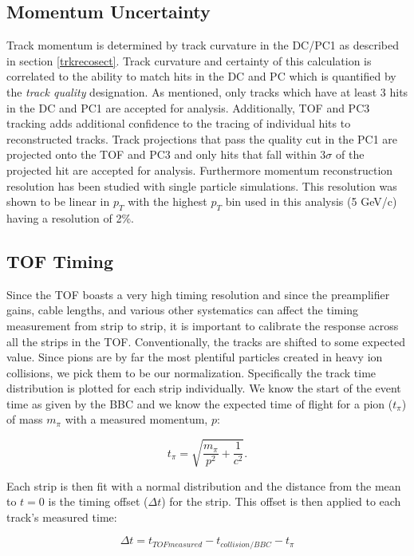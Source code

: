 \subsection{Momentum Uncertainty}
Track momentum is determined by track curvature in the DC/PC1 as described in section \ref{trkrecosect}. Track curvature and certainty of this calculation is correlated to the ability to match hits in the DC and PC which is quantified by the \textit{track quality} designation. As mentioned, only tracks which have at least 3 hits in the DC and PC1 are accepted for analysis. Additionally, TOF and PC3 tracking adds additional confidence to the tracing of individual hits to reconstructed tracks. Track projections that pass the quality cut in the PC1 are projected onto the TOF and PC3 and only hits that fall within $3\sigma$ of the projected hit are accepted for analysis. Furthermore momentum reconstruction resolution has been studied with single particle simulations\citep{Mitchell:2002wu}. This resolution was shown to be linear in $p_T$ with the highest $p_T$ bin used in this analysis (5 GeV/c) having a resolution of 2\%.
 
\subsection{TOF Timing}
Since the TOF boasts a very high timing resolution and since the preamplifier gains, cable lengths, and various other systematics can affect the timing measurement from strip to strip, it is important to calibrate the response across all the strips in the TOF. Conventionally, the tracks are shifted to some expected value. Since pions are by far the most plentiful particles created in heavy ion collisions, we pick them to be our normalization. Specifically the track time distribution is plotted for each strip individually. We know the start of the event time as given by the BBC and we know the expected time of flight for a pion ($t_{\pi}$) of mass $m_{\pi}$ with a measured momentum, $p$:

\begin{equation}
t_{\pi} = \sqrt{\frac{m_{\pi}}{p^2} + \frac{1}{c^2}}.
\end{equation}

Each strip is then fit with a normal distribution and the distance from the mean to $t=0$ is the timing offset ($\Delta t$) for the strip. This offset is then applied to each track's measured time:

\begin{equation}
\Delta t = t_{TOF measured} - t_{collision/BBC} - t_{\pi} 
\end{equation}
 
